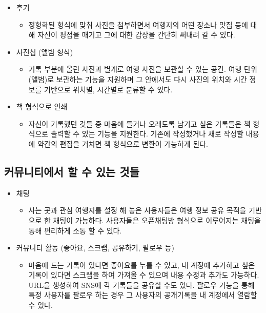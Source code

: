 \begin{itemize}
    \item 후기
        \begin{itemize}
            \item [] 정형화된 형식에 맞춰 사진을 첨부하면서 여행지의 어떤 장소나 맛집 등에 대해 자신이 평점을 매기고 그에 대한 감상을 간단히 써내려 갈 수 있다.
        \end{itemize}
\end{itemize}

\begin{itemize}
    \item 사진첩 (앨범 형식)
        \begin{itemize}
            \item [] 기록 부분에 올린 사진과 별개로 여행 사진을 보관할 수 있는 공간. 여행 단위(앨범)로 보관하는 기능을 지원하며 그 안에서도 다시 사진의 위치와 시간 정보를 기반으로 위치별, 시간별로 분류할 수 있다.
        \end{itemize}
\end{itemize}

\begin{itemize}
    \item 책 형식으로 인쇄
        \begin{itemize}
            \item [] 자신이 기록했던 것들 중 마음에 들거나 오래도록 남기고 싶은 기록들은 책 형식으로 출력할 수 있는 기능을 지원한다. 기존에 작성했거나 새로 작성할 내용에 약간의 편집을 거치면 책 형식으로 변환이 가능하게 된다.
        \end{itemize}
\end{itemize}

\subsection{커뮤니티에서 할 수 있는 것들}

\begin{itemize}
    \item 채팅
    \begin{itemize}
        \item [] 사는 곳과 관심 여행지를 설정 해 놓은 사용자들은 여행 정보 공유 목적을 기반으로 한 채팅이 가능하다. 사용자들은 오픈채팅방 형식으로 이루어지는 채팅을 통해 편리하게 소통 할 수 있다.
    \end{itemize}
\end{itemize}

\begin{itemize}
    \item 커뮤니티 활동 (좋아요, 스크랩, 공유하기, 팔로우 등)
    \begin{itemize}
        \item [] 마음에 드는 기록이 있다면 좋아요를 누를 수 있고, 내 계정에 추가하고 싶은 기록이 있다면 스크랩을 하여 가져올 수 있으며 내용 수정과 추가도 가능하다. URL을 생성하여 SNS에 각 기록들을 공유할 수도 있다. 팔로우 기능을 통해 특정 사용자를 팔로우 하는 경우 그 사용자의 공개기록을 내 계정에서 열람할 수 있다.
    \end{itemize}
\end{itemize}

